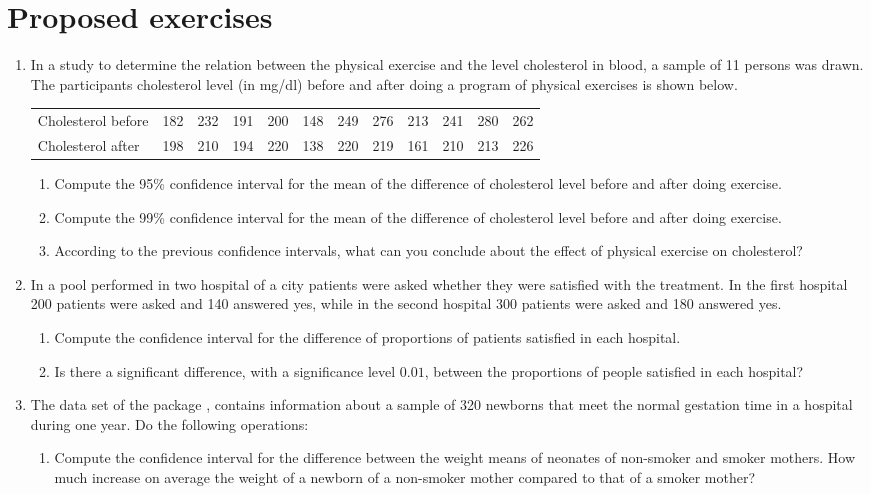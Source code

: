 \section{Proposed exercises}
\begin{enumerate}[leftmargin=*] 
\item  In a study to determine the relation between the physical exercise and the level cholesterol in blood, a sample
of 11 persons was drawn. 
The participants cholesterol level (in mg/dl) before and after doing a program of physical exercises is shown below. 
\begin{center}
\begin{tabular}{lrrrrrrrrrrr}
\toprule
Cholesterol before & 182 & 232 & 191 & 200 & 148 & 249 & 276 & 213 & 241 & 280 & 262 \\
Cholesterol after  & 198 & 210 & 194 & 220 & 138 & 220 & 219 & 161 & 210 & 213 & 226 \\
\bottomrule
\end{tabular}
\end{center}

\begin{enumerate}
\item Compute the 95\% confidence interval for the mean of the difference of cholesterol level before and after doing
exercise.
\item Compute the 99\% confidence interval for the mean of the difference of cholesterol level before and after doing
exercise.
\item According to the previous confidence intervals, what can you conclude about the effect of physical exercise on
cholesterol?
\end {enumerate}

\item In a pool performed in two hospital of a city patients were asked whether they were satisfied with the treatment. 
In the first hospital 200 patients were asked and 140 answered yes, while in the second hospital 300 patients were asked
and 180 answered yes. 
\begin{enumerate}
\item Compute the confidence interval for the difference of proportions of patients satisfied in each hospital.
\item Is there a significant difference, with a significance level $0.01$, between the proportions of people satisfied
in each hospital?
\end{enumerate}

\item The data set  of the package , contains information about a
sample of 320 newborns that meet the normal gestation time in a hospital during one year.
Do the following operations:
\begin{enumerate}
\item Compute the confidence interval for the difference between the weight means of neonates of non-smoker and smoker
mothers.
How much increase on average the weight of a newborn of a non-smoker mother compared to that of a smoker mother? 


\end{enumerate}
\end{enumerate}
